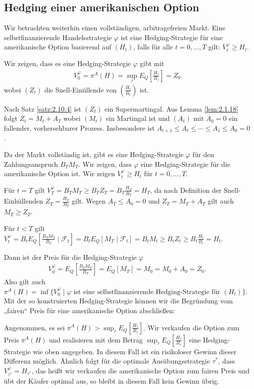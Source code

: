 \documentclass[a4paper,twoside,DIV15,BCOR12mm]{scrbook}
\newcommand{\cF}{\mathcal F}
\begin{document}
\subsection{Hedging einer amerikanischen Option}

Wir betrachten weiterhin einen vollständigen, arbitragefreien Markt. Eine selbstfinanzierende Handelsstrategie $\varphi$ ist eine Hedging-Strategie für eine amerikanische Option basierend auf $(H_t)$, falls für alle $t=0,\ldots,T$ gilt: $V_t^\varphi \ge H_t$.

Wir zeigen, dass es eine Hedging-Strategie $\varphi$ gibt mit
\begin{align*}
V_0^\varphi = \pi^A(H) = \sup_{\tau} E_Q[\frac{H_\tau}{B_\tau}] = Z_0
\end{align*}
wobei $(Z_t)$ die Snell-Einüllende von $(\frac{H_t}{B_t})$ ist.

Nach Satz \ref{satz:2.10.4} ist $(Z_t)$ ein Supermartingal. Aus Lemma \ref{lem:2.1.18} folgt $Z_t = M_t + A_T$ wobei $(M_t)$ ein Martingal ist und $(A_t)$ mit $A_0=0$ ein fallender, vorhersehbarer Prozess. Insbesondere ist $A_{t+1} \le A_t \le \cdots \le A_1 \le A_0 = 0$.

Da der Markt vollständig ist, gibt es eine Hedging-Strategie $\varphi$ für den Zahlungsanspruch $B_TM_T$. Wir zeigen, dass $\varphi$ eine Hedging-Strategie für die amerikanische Option ist. Wir zeigen $V_t^\varphi \ge H_t$ für $t=0,\ldots,T$.

Für $t=T$ gilt $V_T^\varphi = B_T M_T \ge B_TZ_T = B_T \frac{H_T}{B_T} = H_T$, da nach Definition der Snell-Einhüllenden $Z_T = \frac{H_T}{B_T}$ gilt. Wegen $A_T \le A_0=0$ und $Z_T = M_T + A_T$ gilt auch $M_T \ge Z_T$.

Für $t<T$ gilt $V_t^\varphi = B_t E_Q[\frac{B_TM_T}{B_T}\mid \cF_t] = B_tE_Q[M_T\mid \cF_t] = B_t M_t \ge B_tZ_t \ge B_t \frac{H_t}{B_t} = H_t$.

Dann ist der Preis für die Hedging-Strategie $\varphi$
\begin{align*}
V_0^\varphi = E_Q[\frac{B_TM_T}{B_T}] = E_Q[M_T] = M_0 = M_0 + A_0 = Z_0.
\end{align*}
Also gilt auch $\pi^A(H) = \inf\{V_0^\varphi \mid \varphi\text{ ist eine selbstfinanzierende Hedging-Strategie für $(H_t)$}\}$. Mit der so konstruierten Hedging-Strategie können wir die Begründung vom „fairen“ Preis für eine amerikanische Option abschließen:

Angenommen, es sei $\pi^{A}(H) > \sup_\tau E_Q[\frac{H_\tau}{B_\tau}]$. Wir verkaufen die Option zum Preis $\pi^A(H)$ und realisieren mit dem Betrag $\sup_{\tau}E_Q[\frac{H_\tau}{B_\tau}]$ eine Hedging-Strategie wie oben angegeben. In diesem Fall ist ein risikoloser Gewinn dieser Differenz möglich. Ähnlich folgt für die optimale Ausübungsstrategie $\tau^*$, dass $V_{\tau^*}^\varphi = H_{\tau^*}$, das heißt wir verkaufen die amerikanische Option zum fairen Preis und übt der Käufer optimal aus, so bleibt in diesem Fall kein Gewinn übrig.
\end{document}
